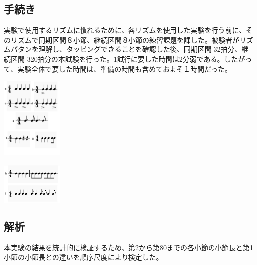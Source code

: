 \documentclass[twocolumn,10pt]{jarticle}
\begin{document}
\subsection{手続き}
実験で使用するリズムに慣れるために、各リズムを使用した実験を行う前に、そのリズムで同期区間８小節、継続区間８小節の練習課題を課した。被験者がリズムパタンを理解し、タッピングできることを確認した後、同期区間 32拍分、継続区間 320拍分の本試験を行った。1試行に要した時間は2分弱である。したがって、実験全体で要した時間は、準備の時間も含めておよそ１時間だった。
\begin{center}
	\includegraphics[width=3cm]{patna_g.jpeg}
\end{center}	
\begin{center}
	\includegraphics[width=3cm]{patnh_i.jpeg}
\end{center}	

\subsection{解析}
本実験の結果を統計的に検証するため、第2から第80までの各小節の小節長と第1小節の小節長との違いを順序尺度により検定した。



\end{document}
